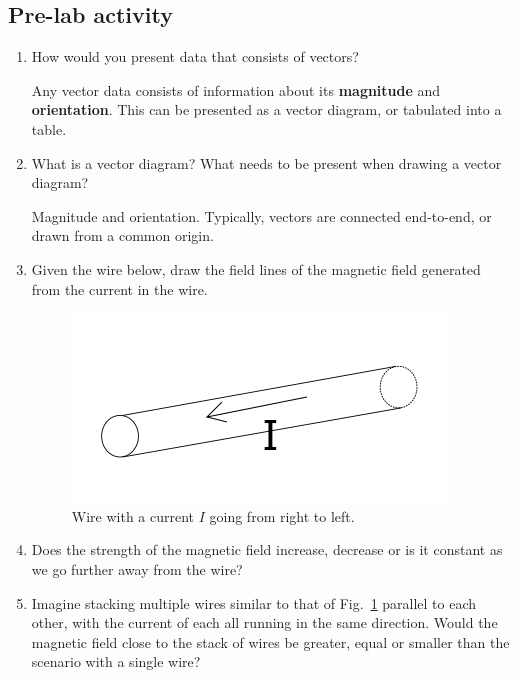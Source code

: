 \documentclass[12pt]{report}
\begin{document}
\subsection{Pre-lab activity}
\begin{enumerate}
\item How would you present data that consists of vectors?

\begin{tcolorbox}[title=Answer]
Any vector data consists of information about its \textbf{magnitude} and \textbf{orientation}. This can be presented as a vector diagram, or tabulated into a table.
\end{tcolorbox}

\item What is a vector diagram? What needs to be present when drawing a vector diagram?

\begin{tcolorbox}[title=Answer]
Magnitude and orientation. Typically, vectors are connected end-to-end, or drawn from a common origin.
\end{tcolorbox}

\item Given the wire below, draw the field lines of the magnetic field generated from the current in the wire.

\begin{figure}[h]
\centering
\includegraphics[scale=0.5]{lab3-wire}
\caption{Wire with a current $I$ going from right to left.}
\label{Fig:lab3-prelab-wire}
\end{figure}

\item Does the strength of the magnetic field increase, decrease or is it constant as we go further away from the wire?

\item Imagine stacking multiple wires similar to that of Fig.~\ref{Fig:lab3-prelab-wire} parallel to each other, with the current of each all running in the same direction. Would the magnetic field close to the stack of wires  be greater, equal or smaller than the scenario with a single wire?


\end{enumerate}
\end{document}
